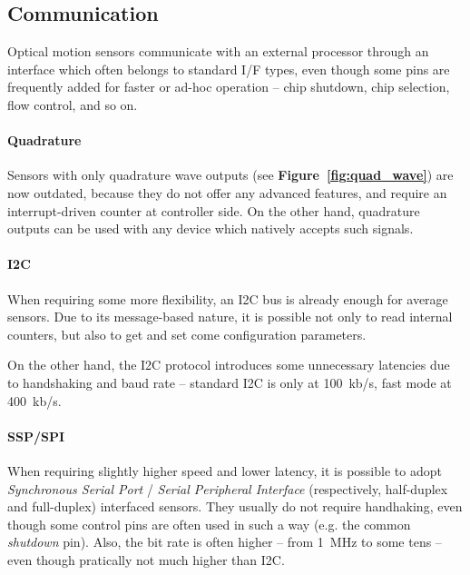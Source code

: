 \documentclass[a4paper,10pt]{article}
\begin{document}
\begin{multicols}{2}
\subsection{Communication}

Optical motion sensors communicate with an external processor through an
interface which often belongs to standard I/F types, even though some pins
are frequently added for faster or ad-hoc operation -- chip shutdown, chip
selection, flow control, and so on.


\paragraph{Quadrature}
Sensors with only quadrature wave outputs (see \textbf{Figure~\ref{fig:quad_wave}})
are now outdated, because they do not offer any advanced features, and require
an interrupt-driven counter at controller side. On the other hand, quadrature
outputs can be used with any device which natively accepts such signals.


\paragraph{I2C}
When requiring some more flexibility, an I2C bus is already enough for average
sensors. Due to its message-based nature, it is possible not only to read
internal counters, but also to get and set come configuration parameters.

On the other hand, the I2C protocol introduces some unnecessary latencies
due to handshaking and baud rate -- standard I2C is only at 100~kb/s, fast
mode at 400~kb/s.

\INSFIG


\paragraph{SSP/SPI}
When requiring slightly higher speed and lower latency, it is possible to
adopt \emph{Synchronous Serial Port} / \emph{Serial Peripheral Interface}
(respectively, half-duplex and full-duplex) interfaced sensors.
They usually do not require handhaking, even though some control pins are
often used in such a way (e.g. the common \emph{shutdown} pin).
Also, the bit rate is often higher -- from 1~MHz to some tens -- even though
pratically not much higher than I2C.

\INSFIG



\end{multicols}
\end{document}
